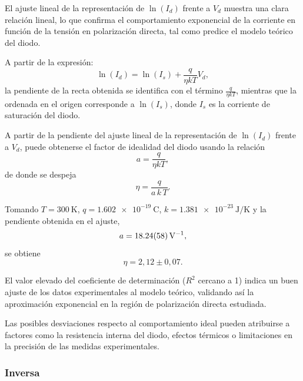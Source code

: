 \documentclass[a4paper,12pt]{article}
\begin{document}
El ajuste lineal de la representación de $\ln(I_d)$ frente a $V_d$ muestra una clara relación lineal, lo que confirma el comportamiento exponencial de la corriente en función de la tensión en polarización directa, tal como predice el modelo teórico del diodo.

A partir de la expresión:
\begin{equation}
\ln(I_d) = \ln(I_s) + \frac{q}{\eta k T} V_d,
\end{equation}
la pendiente de la recta obtenida se identifica con el término $\frac{q}{\eta k T}$, mientras que la ordenada en el origen corresponde a $\ln(I_s)$, donde $I_s$ es la corriente de saturación del diodo.


  A partir de la pendiente del ajuste lineal de la representación de $\ln(I_d)$ frente a $V_d$, puede obtenerse el factor de idealidad del diodo usando la relación
\begin{equation}
a=\frac{q}{\eta kT},
\end{equation}
de donde se despeja
\begin{equation}
\eta=\frac{q}{a\,k\,T}.
\end{equation}

Tomando $T=\SI{300}{\kelvin}$, $q=\SI{1.602e-19}{\coulomb}$, $k=\SI{1.381e-23}{\joule\per\kelvin}$ y la pendiente obtenida en el ajuste,
\begin{equation}
a = \SI{18.24 \pm 0.58}{\per\volt},
\end{equation}
se obtiene
\begin{equation}
\eta = 2,12 \pm 0,07.
\end{equation}

El valor elevado del coeficiente de determinación ($R^2$ cercano a 1) indica un buen ajuste de los datos experimentales al modelo teórico, validando así la aproximación exponencial en la región de polarización directa estudiada.

Las posibles desviaciones respecto al comportamiento ideal pueden atribuirse a factores como la resistencia interna del diodo, efectos térmicos o limitaciones en la precisión de las medidas experimentales.

\subsubsection{Inversa}
\end{document}
